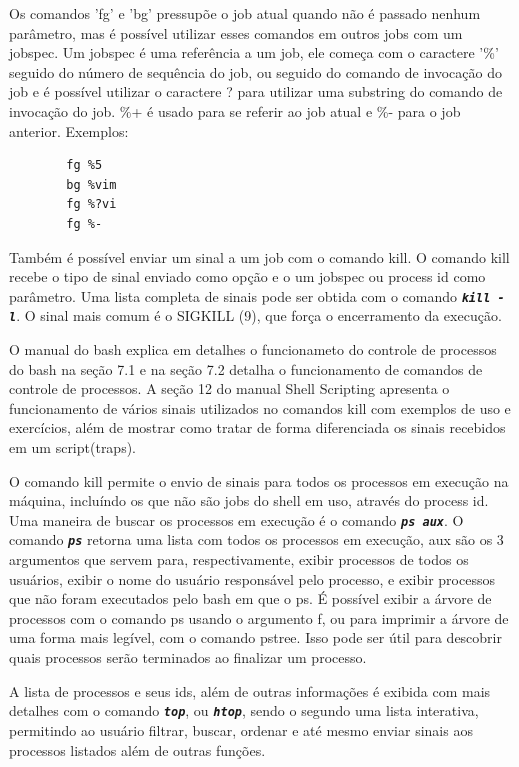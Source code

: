\documentclass[oneside, 11 pt]{article}
\begin{document}
	Os comandos 'fg' e 'bg' pressupõe o job atual quando não é passado nenhum parâmetro, mas é possível utilizar esses comandos em outros jobs com um jobspec. Um jobspec é uma referência a um job, ele começa com o caractere '\%' seguido do número de sequência do job, ou seguido do comando de invocação do job e é possível utilizar o caractere ? para utilizar uma substring do comando de invocação do job. \%+ é usado para se referir ao job atual e \%- para o job anterior.
	Exemplos:
	\begin{lstlisting}
		fg %5
		bg %vim
		fg %?vi
		fg %-
	\end{lstlisting}
	
	Também é possível enviar um sinal a um job com o comando kill. O comando kill recebe o tipo de sinal enviado como opção e o um jobspec ou process id como parâmetro. Uma lista completa de sinais pode ser obtida com o comando \texttt{\textbf{\textit{kill -l}}}. O sinal mais comum é o SIGKILL (9), que força o encerramento da execução.
	 
	O manual do bash \cite{bashman} explica em detalhes o funcionameto do controle de processos do bash na seção 7.1 e na seção 7.2 detalha o funcionamento de comandos de controle de processos. A seção 12 do manual Shell Scripting \cite{learnl} apresenta o funcionamento de vários sinais utilizados no comandos kill com exemplos de uso e exercícios, além de mostrar como tratar de forma diferenciada os sinais recebidos em um script(traps).
	
	O comando kill permite o envio de sinais para todos os processos em execução na máquina, incluíndo os que não são jobs do shell em uso, através do process id. Uma maneira de buscar os processos em execução é o comando \texttt{\textbf{\textit{ps aux}}}. O comando \texttt{\textbf{\textit{ps}}} retorna uma lista com todos os processos em execução, aux são os 3 argumentos que servem para, respectivamente, exibir processos de todos os usuários, exibir o nome do usuário responsável pelo processo, e exibir processos que não foram executados pelo bash em que o ps. É possível exibir a árvore de processos com o comando ps usando o argumento f, ou para imprimir a árvore de uma forma mais legível, com o comando pstree. Isso pode ser útil para descobrir quais processos serão terminados ao finalizar um processo.
	
	A lista de processos e seus ids, além de outras informações é exibida com mais detalhes com o comando \texttt{\textbf{\textit{top}}}, ou \texttt{\textbf{\textit{htop}}}, sendo o segundo uma lista interativa, permitindo ao usuário filtrar, buscar, ordenar e até mesmo enviar sinais aos processos listados além de outras funções.
	
\end{document}
